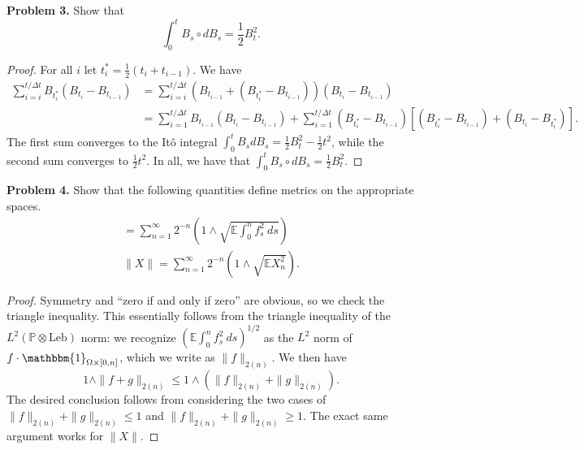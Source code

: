 \documentclass[11pt,letterpaper]{report}
\newcommand{\E}{\mathbb{E}}
\newcommand{\Prob}{\mathbb{P}}
\newcommand{\ind}{\mathbbm{1}}
\begin{document}
\noindent\textbf{Problem 3. }
Show that
\[
\int_0^tB_s\circ dB_s = \frac{1}{2}B_t^2.
\]
\begin{proof}
	For all $i$ let $t_i^* = \frac{1}{2}(t_i +t_{i-1})$. We have
	\begin{align*}
		\sum_{i = i}^{t/\Delta t}B_{t_i^*}(B_{t_i}-B_{t_{i-1}}) &= \sum_{i = i}^{t/\Delta t}(B_{t_{i-1}} + (B_{t_i^*}-B_{t_{i-1}}))(B_{t_i}-B_{t_{i-1}})\\
		&= \sum_{i=1}^{t/\Delta t}B_{t_{i-1}}(B_{t_i}-B_{t_{i-1}}) + \sum_{i=1}^{t/\Delta t}(B_{t_i^*} - B_{t_{i-1}})[(B_{t_i^*} - B_{t_{i-1}})+(B_{t_i} - B_{t_i^*})].
	\end{align*}
	The first sum converges to the It\^o integral $\int_0^tB_sdB_s = \frac{1}{2}B_t^2 - \frac{1}{2}t^2$, while the second sum converges to $\frac{1}{2}t^2$. In all, we have that $\int_0^tB_s\circ dB_s = \frac{1}{2}B_t^2$.
\end{proof}

\noindent\textbf{Problem 4. }
Show that the following quantities define metrics on the appropriate spaces.
\begin{gather*}
	[f] = \sum_{n=1}^\infty 2^{-n}\left( 1 \land \sqrt{\E\int_0^nf_s^2\ ds} \right)\\
	\|X\| = \sum_{n=1}^\infty 2^{-n}\left(1 \land \sqrt{\E X_n^2} \right).
\end{gather*}
\begin{proof}
	Symmetry and ``zero if and only if zero'' are obvious, so we check the triangle inequality. This essentially follows from the triangle inequality of the $L^2(\Prob \otimes \text{Leb})$ norm: we recognize $(\E\int_0^n f^2_s\ ds)^{1/2}$ as the $L^2$ norm of $f\cdot \ind_{\Omega \times [0, n]}$, which we write as $\|f\|_{2(n)}$. We then have
	\[
	1 \land \|f+g\|_{2(n)} \leq 1 \land (\|f\|_{2(n)}+\|g\|_{2(n)}).
	\]
	The desired conclusion follows from considering the two cases of $\|f\|_{2(n)}+\|g\|_{2(n)} \leq 1$ and $\|f\|_{2(n)}+\|g\|_{2(n)} \geq 1$. The exact same argument works for $\|X\|$.
\end{proof}
\end{document}
